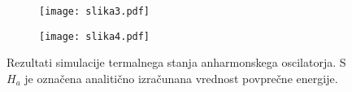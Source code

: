 \documentclass[a4paper]{article}
\begin{document}
    \begin{figure}
        \centering
        \begin{subfigure}{\textwidth}
            \texttt{[image: slika3.pdf]}
            \caption{}
        \end{subfigure}
        \begin{subfigure}{\textwidth}
            \texttt{[image: slika4.pdf]}
            \caption{}
        \end{subfigure}
        \caption{Rezultati simulacije termalnega stanja anharmonskega oscilatorja.
        S $H_a$ je označena analitično izračunana vrednost povprečne energije.}
        \label{slika2}
    \end{figure}
\end{document}
